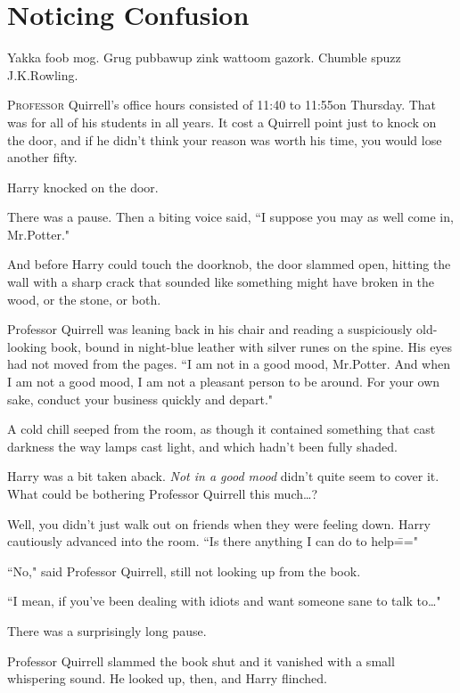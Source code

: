 \chapter{Noticing Confusion}

\begin{chapterOpeningAuthorNote}
Yakka foob mog. Grug pubbawup zink wattoom gazork. Chumble spuzz J.\?K.\?Rowling.
\end{chapterOpeningAuthorNote}

\lettrine{P}{rofessor} Quirrell's office hours consisted of 11:40 to 11:55\am on Thursday. That was for all of his students in all years. It cost a Quirrell point just to knock on the door, and if he didn't think your reason was worth his time, you would lose another fifty.

Harry knocked on the door.

There was a pause. Then a biting voice said, ``I suppose you may as well come in, Mr.\?Potter."

And before Harry could touch the doorknob, the door slammed open, hitting the wall with a sharp crack that sounded like something might have broken in the wood, or the stone, or both.

Professor Quirrell was leaning back in his chair and reading a suspiciously old-looking book, bound in night-blue leather with silver runes on the spine. His eyes had not moved from the pages. ``I am not in a good mood, Mr.\?Potter. And when I am not a good mood, I am not a pleasant person to be around. For your own sake, conduct your business quickly and depart."

A cold chill seeped from the room, as though it contained something that cast darkness the way lamps cast light, and which hadn't been fully shaded.

Harry was a bit taken aback. \emph{Not in a good mood} didn't quite seem to cover it. What could be bothering Professor Quirrell this much{\ldots}?

Well, you didn't just walk out on friends when they were feeling down. Harry cautiously advanced into the room. ``Is there anything I can do to help\==="

``No," said Professor Quirrell, still not looking up from the book.

``I mean, if you've been dealing with idiots and want someone sane to talk to{\ldots}"

There was a surprisingly long pause.

Professor Quirrell slammed the book shut and it vanished with a small whispering sound. He looked up, then, and Harry flinched.

